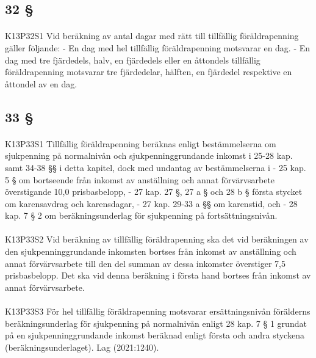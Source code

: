 \documentclass[a4paper,notitlepage,openany,10pt]{book}
\begin{document}
\subsection*{32 §}
\paragraph*{}
{\tiny K13P32S1}
Vid beräkning av antal dagar med rätt till tillfällig föräldrapenning gäller följande:
\newline - En dag med hel tillfällig föräldrapenning motsvarar en dag.
\newline - En dag med tre fjärdedels, halv, en fjärdedels eller en åttondels tillfällig föräldrapenning motsvarar tre fjärdedelar, hälften, en fjärdedel respektive en åttondel av en dag.
\subsection*{33 §}
\paragraph*{}
{\tiny K13P33S1}
Tillfällig föräldrapenning beräknas enligt bestämmelserna om sjukpenning på normalnivån och sjukpenninggrundande inkomst i 25-28 kap. samt 34-38 §§ i detta kapitel, dock med undantag av bestämmelserna i
\newline - 25 kap. 5 § om bortseende från inkomst av anställning och annat förvärvsarbete överstigande 10,0 prisbasbelopp,
\newline - 27 kap. 27 §, 27 a § och 28 b § första stycket om karensavdrag och karensdagar,
\newline - 27 kap. 29-33 a §§ om karenstid, och
\newline - 28 kap. 7 § 2 om beräkningsunderlag för sjukpenning på fortsättningsnivån.
\paragraph*{}
{\tiny K13P33S2}
Vid beräkning av tillfällig föräldrapenning ska det vid beräkningen av den sjukpenninggrundande inkomsten bortses från inkomst av anställning och annat förvärvsarbete till den del summan av dessa inkomster överstiger 7,5 prisbasbelopp. Det ska vid denna beräkning i första hand bortses från inkomst av annat förvärvsarbete.
\paragraph*{}
{\tiny K13P33S3}
För hel tillfällig föräldrapenning motsvarar ersättningsnivån förälderns beräkningsunderlag för sjukpenning på normalnivån enligt 28 kap. 7 § 1 grundat på en sjukpenninggrundande inkomst beräknad enligt första och andra styckena (beräkningsunderlaget).
Lag (2021:1240).
\end{document}
